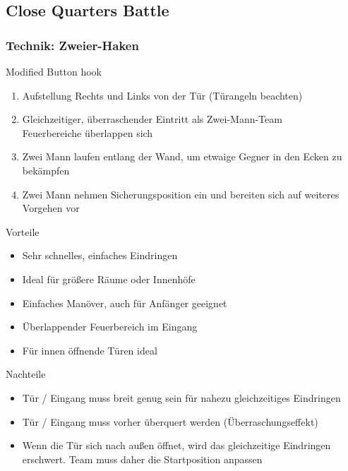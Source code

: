 \newpage
\subsection{Close Quarters Battle}
\label{CQB}
\subsubsection{Technik: Zweier-Haken}
\begin{center}
	Modified Button hook
\end{center}
\begin{enumerate}
	\item Aufstellung Rechts und Links von der Tür (Türangeln beachten)
	\item Gleichzeitiger, überraschender Eintritt als Zwei-Mann-Team \\
		Feuerbereiche überlappen sich
	\item Zwei Mann laufen entlang der Wand, um etwaige Gegner in den Ecken zu bekämpfen
	\item Zwei Mann nehmen Sicherungsposition ein und bereiten sich auf weiteres Vorgehen vor
 \end{enumerate}        
 Vorteile
 \begin{itemize}
	 \item Sehr schnelles, einfaches Eindringen
	 \item Ideal für größere Räume oder Innenhöfe
	 \item Einfaches Manöver, auch für Anfänger geeignet
	 \item Überlappender Feuerbereich im Eingang
	 \item Für innen öffnende Türen ideal
 \end{itemize}     
  Nachteile
  \begin{itemize}
  	\item Tür / Eingang muss breit genug sein für nahezu gleichzeitiges Eindringen
  	\item Tür / Eingang muss vorher überquert werden (Überraschungseffekt)
  	\item Wenn die Tür sich nach außen öffnet, wird das gleichzeitige Eindringen erschwert. Team muss daher die Startposition anpassen
  \end{itemize}          
